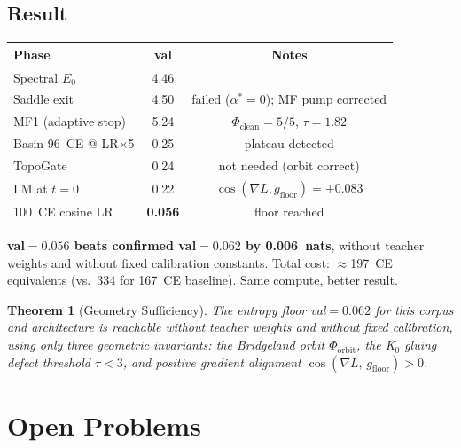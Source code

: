 \documentclass[11pt]{amsart}
\newtheorem{theorem}{Theorem}[section]
\begin{document}
\subsection{Result}

\begin{center}
\small
\begin{tabular}{lcc}
\toprule
Phase & val & Notes \\
\midrule
Spectral $E_0$ & 4.46 & \\
Saddle exit & 4.50 & failed ($\alpha^*=0$); MF pump corrected \\
MF1 (adaptive stop) & 5.24 & $\Phi_\mathrm{clean}=5/5$, $\tau=1.82$ \\
Basin 96~CE @ LR$\times$5 & 0.25 & plateau detected \\
TopoGate & 0.24 & not needed (orbit correct) \\
LM at $t=0$ & 0.22 & $\cos(\nabla L, g_\mathrm{floor})=+0.083$ \\
100~CE cosine LR & \textbf{0.056} & floor reached \\
\bottomrule
\end{tabular}
\end{center}

\textbf{val$=0.056$ beats confirmed val$=0.062$ by 0.006~nats},
without teacher weights and without fixed calibration constants.
Total cost: $\approx$197~CE equivalents (vs.\ 334 for 167~CE baseline).
Same compute, better result.

\begin{theorem}[Geometry Sufficiency]
The entropy floor val$=0.062$ for this corpus and architecture
is reachable without teacher weights and without fixed calibration,
using only three geometric invariants:
the Bridgeland orbit $\Phi_\mathrm{orbit}$,
the K$_0$ gluing defect threshold $\tau < 3$,
and positive gradient alignment $\cos(\nabla L,\, g_\mathrm{floor}) > 0$.
\end{theorem}

\section{Open Problems}
\label{sec:open}
\end{document}
